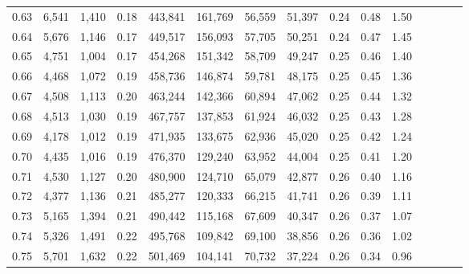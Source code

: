 \begin{tabular}{rrrcrrrrrrrrrrr}
0.63 &   6,541 &  1,410 &                                       0.18 &  443,841 &  161,769 &   56,559 &   51,397 &  0.24 &  0.48 &                         1.50 \\
0.64 &   5,676 &  1,146 &                                       0.17 &  449,517 &  156,093 &   57,705 &   50,251 &  0.24 &  0.47 &                         1.45 \\
0.65 &   4,751 &  1,004 &                                       0.17 &  454,268 &  151,342 &   58,709 &   49,247 &  0.25 &  0.46 &                         1.40 \\
0.66 &   4,468 &  1,072 &                                       0.19 &  458,736 &  146,874 &   59,781 &   48,175 &  0.25 &  0.45 &                         1.36 \\
0.67 &   4,508 &  1,113 &                                       0.20 &  463,244 &  142,366 &   60,894 &   47,062 &  0.25 &  0.44 &                         1.32 \\
0.68 &   4,513 &  1,030 &                                       0.19 &  467,757 &  137,853 &   61,924 &   46,032 &  0.25 &  0.43 &                         1.28 \\
0.69 &   4,178 &  1,012 &                                       0.19 &  471,935 &  133,675 &   62,936 &   45,020 &  0.25 &  0.42 &                         1.24 \\
0.70 &   4,435 &  1,016 &                                       0.19 &  476,370 &  129,240 &   63,952 &   44,004 &  0.25 &  0.41 &                         1.20 \\
0.71 &   4,530 &  1,127 &                                       0.20 &  480,900 &  124,710 &   65,079 &   42,877 &  0.26 &  0.40 &                         1.16 \\
0.72 &   4,377 &  1,136 &                                       0.21 &  485,277 &  120,333 &   66,215 &   41,741 &  0.26 &  0.39 &                         1.11 \\
0.73 &   5,165 &  1,394 &                                       0.21 &  490,442 &  115,168 &   67,609 &   40,347 &  0.26 &  0.37 &                         1.07 \\
0.74 &   5,326 &  1,491 &                                       0.22 &  495,768 &  109,842 &   69,100 &   38,856 &  0.26 &  0.36 &                         1.02 \\
0.75 &   5,701 &  1,632 &                                       0.22 &  501,469 &  104,141 &   70,732 &   37,224 &  0.26 &  0.34 &                         0.96 \\

\end{tabular}

